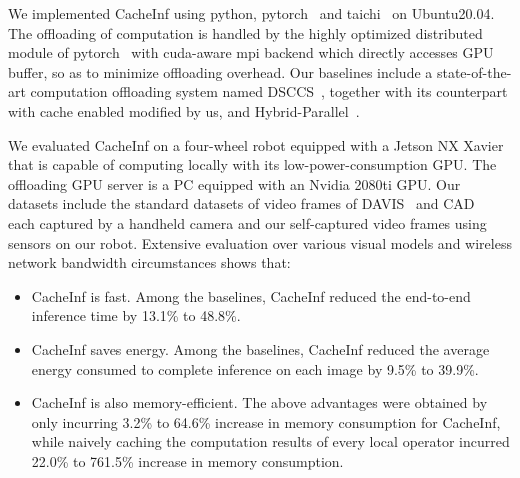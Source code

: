 
We implemented CacheInf using python, pytorch~\cite{paszke2017automatic} and taichi~\cite{taichi} on Ubuntu20.04. 
The offloading of computation is handled by the highly optimized distributed module of pytorch~\cite{torch_distributed} with cuda-aware mpi backend which directly accesses GPU buffer, so as to minimize offloading overhead.
Our baselines include a state-of-the-art computation offloading system named DSCCS~\cite{liang2023dnn}, together with its counterpart with cache enabled modified by us, and Hybrid-Parallel~\cite{sun2024hybridparallel}.

We evaluated CacheInf on a four-wheel robot equipped with a Jetson NX Xavier~\cite{jetsonnx} that is capable of computing locally with its low-power-consumption GPU.
The offloading GPU server is a PC equipped with an Nvidia 2080ti GPU.
Our datasets include the standard datasets of video frames of DAVIS~\cite{Perazzi2016} and CAD~\cite{Choi_VSWS_2009} each captured by a handheld camera and our self-captured video frames using sensors on our robot.
Extensive evaluation over various visual models and wireless network bandwidth circumstances shows that:
\begin{itemize}
    \item CacheInf is fast. Among the baselines, CacheInf reduced the end-to-end inference time by 13.1\% to 48.8\%.
    \item CacheInf saves energy. Among the baselines, CacheInf reduced the average energy consumed to complete inference on each image by 9.5\% to 39.9\%.
    \item CacheInf is also memory-efficient. The above advantages were obtained by only incurring 3.2\% to 64.6\% increase in memory consumption for CacheInf, while naively caching the computation results of every local operator incurred 22.0\% to 761.5\% increase in memory consumption.
\end{itemize}

